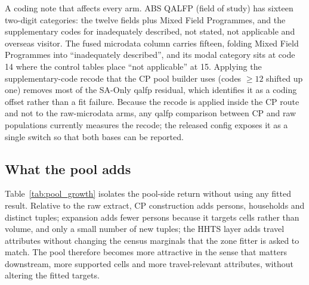 \documentclass[review]{elsarticle}
\begin{document}
A coding note that affects every arm. ABS QALFP (field of study) has sixteen two-digit categories: the twelve fields plus Mixed Field Programmes, and the supplementary codes for inadequately described, not stated, not applicable and overseas visitor. The fused microdata column carries fifteen, folding Mixed Field Programmes into ``inadequately described'', and its modal category sits at code 14 where the control tables place ``not applicable'' at 15. Applying the supplementary-code recode that the CP pool builder uses (codes $\ge 12$ shifted up one) removes most of the SA-Only qalfp residual, which identifies it as a coding offset rather than a fit failure. Because the recode is applied inside the CP route and not to the raw-microdata arms, any qalfp comparison between CP and raw populations currently measures the recode; the released config exposes it as a single switch so that both bases can be reported.



\subsection{What the pool adds}
\label{sec:pool_growth}
Table~\ref{tab:pool_growth} isolates the pool-side return without using any
fitted result. Relative to the raw extract, CP construction adds persons,
households and distinct tuples; expansion adds fewer persons because it targets
cells rather than volume, and only a small number of new tuples; the HHTS layer
adds travel attributes without changing the census marginals that the zone
fitter is asked to match. The pool therefore becomes more attractive in the
sense that matters downstream, more supported cells and more travel-relevant
attributes, without altering the fitted targets.
\end{document}
